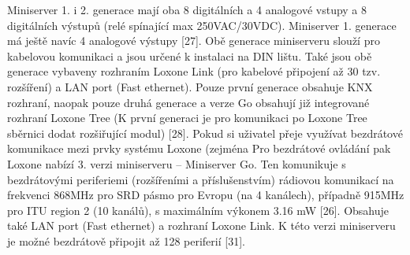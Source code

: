 Miniserver 1. i 2. generace mají oba 8 digitálních a 4 analogové vstupy a 8 digitálních výstupů (relé spínající max 250VAC/30VDC). Miniserver 1. generace má ještě navíc 4 analogové výstupy [27]. Obě generace miniserveru slouží pro kabelovou komunikaci a jsou určené k instalaci na DIN lištu. Také jsou obě generace vybaveny rozhraním Loxone Link (pro kabelové připojení až 30 tzv. rozšíření) a LAN port (Fast ethernet). Pouze první generace obsahuje KNX rozhraní, naopak pouze druhá generace a verze Go obsahují již integrované rozhraní Loxone Tree (K první generaci je pro komunikaci po Loxone Tree sběrnici dodat rozšiřující modul) [28]. \newline
Pokud si uživatel přeje využívat bezdrátové komunikace mezi prvky systému Loxone (zejména Pro bezdrátové ovládání pak Loxone nabízí 3. verzi miniserveru – Miniserver Go. Ten komunikuje s bezdrátovými periferiemi (rozšířeními a příslušenstvím) rádiovou komunikací na frekvenci 868MHz pro SRD pásmo pro Evropu (na 4 kanálech), případně 915MHz pro ITU region 2 (10 kanálů), s maximálním výkonem 3.16 mW [26]. Obsahuje také LAN port (Fast ethernet) a rozhraní Loxone Link. K této verzi miniserveru je možné bezdrátově připojit až 128 periferií [31].

